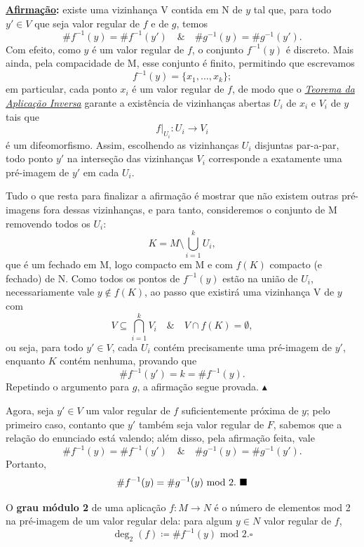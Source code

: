 \documentclass[../differential_topology.tex]{subfiles}
\begin{document}
\begin{proof*}
	\textbf{\underline{Afirmação}:} existe uma vizinhança V contida em N de \(y\) tal que, para todo \(y'\in V\) que seja valor regular de \(f\) e de \(g\), temos
	\[
		\# f^{-1}(y) = \# f^{-1}(y') \quad\&\quad \#g^{-1}(y)=\#g^{-1}(y').
	\]
	Com efeito, como \(y\) é um valor regular de \(f\), o conjunto \(f^{-1}(y)\) é discreto. Mais ainda, pela compacidade de M, esse conjunto é finito, permitindo que escrevamos
	\[
		f^{-1}(y) = \{x_1, \dotsc , x_{k}\};
	\]
	em particular, cada ponto \(x_{i}\) é um valor regular de \(f\), de modo que o \hyperlink{inverse_function}{\textit{Teorema da Aplicação Inversa}} garante a existência de vizinhanças abertas \(U_{i}\) de \(x_{i}\) e \(V_{i}\) de \(y\) tais que
	\[
		f|_{U_{i}}:U_{i}\rightarrow V_{i}
	\]
	é um difeomorfismo. Assim, escolhendo as vizinhanças \(U_{i}\) disjuntas par-a-par, todo ponto \(y'\) na interseção das vizinhanças \(V_{i}\) corresponde a exatamente uma pré-imagem de \(y'\) em cada \(U_{i}\).

	Tudo o que resta para finalizar a afirmação é mostrar que não existem outras pré-imagens fora dessas vizinhanças, e para tanto, consideremos o conjunto de M removendo todos os \(U_{i}\):
	\[
		K = M\setminus{\bigcup_{i=1}^{k}U_{i}},
	\]
	que é um fechado em M, logo compacto em M e com \(f(K)\) compacto (e fechado) de N. Como todos os pontos de \(f^{-1}(y)\) estão na união de \(U_{i}\), necessariamente vale \(y\not\in f(K)\), ao passo que existirá uma vizinhança V de \(y\) com
	\[
		V\subseteq \bigcap_{i=1}^{k}V_{i} \quad\&\quad V\cap f(K) = \emptyset ,
	\]
	ou seja, para todo \(y'\in V\), cada \(U_{i}\) contém precisamente uma pré-imagem de \(y'\), enquanto \(K\) contém nenhuma, provando que
	\[
		\#f^{-1}(y') = k = \#f^{-1}(y).
	\]
	Repetindo o argumento para \(g\), a afirmação segue provada. \(\blacktriangle\)

	Agora, seja \(y'\in V\) um valor regular de \(f\) suficientemente próxima de \(y\); pelo primeiro caso, contanto que \(y'\) também seja valor regular de \(F\), sabemos que a relação do enunciado está valendo; além disso, pela afirmação feita, vale
	\[
		\# f^{-1}(y) = \# f^{-1}(y') \quad\&\quad \#g^{-1}(y)=\#g^{-1}(y').
	\]
	Portanto,
	\[
		\#f^{-1}(y) =\#g^{-1}(y) \text{ mod }2. \text{ $\blacksquare$}
	\]
\end{proof*}

\begin{def*}
	O \textbf{grau módulo 2} de uma aplicação \(f:M\rightarrow N\) é o número de elementos mod 2 na pré-imagem de um valor regular dela: para algum \(y\in N\) valor regular de \(f\),
	\[
		\deg_{2}{(f)} \coloneqq \#f^{-1}(y) \text{ mod 2}. \square
	\]
\end{def*}
\end{document}
